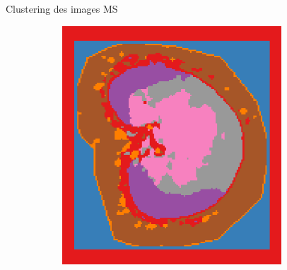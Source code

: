 \documentclass[10pt]{beamer}
\begin{document}
\begin{frame}{Clustering des images MS}
\begin{figure}[ht]
\begin{subfigure}[t]{0.25\textwidth}
        \caption{}
        \label{subfig:clustering_250Xyl_s5.png}
      \end{subfigure}%
      \begin{subfigure}[t]{0.25\textwidth}
        \centering
        \includegraphics[width=0.9\textwidth]{fig/clustering_250Xyl_s12.png}
        \caption{}
        \label{subfig:clustering_250Xyl_s12.png}
      \end{subfigure}%

    \end{figure}




\end{frame}
\end{document}
